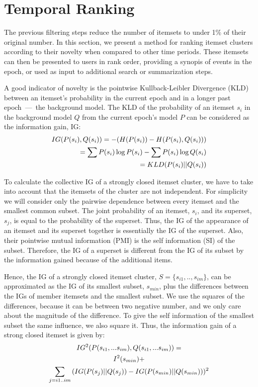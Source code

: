 \documentclass{sig-alternate}
\begin{document}
\section{Temporal Ranking}
\label{sec:rank}
The previous filtering steps reduce the number of itemsets to under 1\% of their
original number.
In this section, we present a method for ranking itemset clusters according to
their novelty when compared to other time periods.
These itemsets can then be presented to users in rank order, providing a
synopis of events in the epoch, or used as input to additional search or
summarization steps.

A good indicator of novelty is the pointwise Kullback-Leibler Divergence (KLD)
between an itemset's probability in the current epoch and in a longer past
epoch~---~the background model.
The KLD of the probability of an itemset $s_i$ in the background
model $Q$ from the current epoch's model $P$ can be considered as
the information gain, IG: 
\begin{align}IG(P(s_i),Q(s_i))  = - (H(P(s_i)) - H(P(s_i),Q(s_i))) \notag\\ = \sum{P(s_i) \log{P(s_i)}} - \sum{P(s_i) \log{Q(s_i)}} \notag\\ = KLD(P(s_i)||Q(s_i))\end{align}

To calculate the collective IG of a strongly closed itemset cluster,
we have to take into account that the itemsets of the cluster are not independent. 
For simplicity we will consider only the pairwise dependence between 
every itemset and the smallest common subset.
The joint probability of an itemset, $s_i$, and its superset,
$s_j$, is equal to the probability of the superset.
Thus, the IG of the appearance of an itemset and its superset
together is essentially the IG of the superset.
Also, their pointwise mutual information (PMI) is the self information (SI) of
the subset. Therefore, the IG of a superset is different from the
IG of its subset by the information gained because
of the additional items. 

Hence, the IG of a strongly closed itemset cluster,
$S=\{s_{i1},..,s_{im}\}$, 
can be approximated as the IG of its smallest subset, $s_{min}$,
plus the differences between the IGs of member itemsets and the smallest subset.
We use the squares of the differences, because it can be between two negative number, and we only care about the magnitude of the difference.
To give the self information of the smallest subset the same influence,
we also square it.
Thus, the information gain of a strong closed itemset is given by:
\begin{multline}IG^2(P(s_{i1},...s_{im}),Q(s_{i1},...s_{im})) =\notag\\ I^2(s_{min}) + \notag\\ 
\sum_{j = i1..im}{(IG(P(s_j)||Q(s_j)) - IG(P(s_{min})||Q(s_{min})))^{2}} \end{multline}
\end{document}
